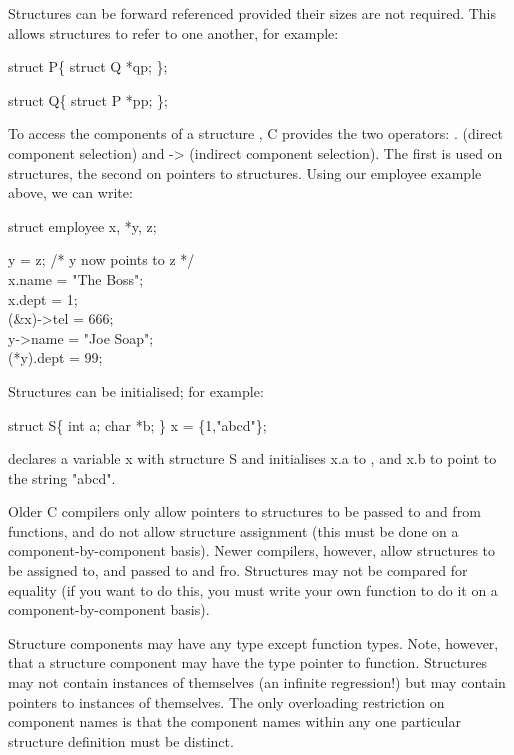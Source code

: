      Structures can  be  forward  referenced  
provided  their  sizes
are  not required. This allows structures to refer to one another,
for example:
\begin{code}
struct P\{ struct Q *qp; \}; \addVspace

struct Q\{ struct P *pp; \};
\end{code}
\noindent
     To access  the components  of a 
structure
, C provides the two
operators: {\cd .} ({\kc direct component  selection\/}) and {\cd ->}
({\kc indirect component selection\/}).  The first is used  on
structures, the second  on  pointers  to  structures.  Using  our
{\cd employee} example above, we can write:
\begin{code}
  struct employee x, *y, z;   \addVspace

  y = z; \tab\tab\tab /* y now points to z */ \\
  x.name = "The Boss";	   \\
  x.dept = 1;		   \\
  (\&x)->tel = 666;	   \\
  y->name = "Joe Soap";	   \\
  (*y).dept = 99;
\end{code}
\noindent
     Structures can be initialised; for example:
\begin{code}
struct S\{ int a; char *b; \} x = \{1,"abcd"\};
\end{code}
\noindent
 declares a variable {\cd x} with structure {\cd S} and initialises
{\cd x.a} to {}, and {\cd x.b} to point to the string {\cd
"abcd"}.

     Older C  compilers only  allow pointers to structures to be
passed to and from 
functions,  
and do not allow structure assignment
(this must be done on a com\-po\-nent-by-component basis).  Newer
compilers,  however, allow structures to be assigned to, and passed to
and fro.  Structures may  not be  compared for equality (if you want
to do this, you must write your own function to do it on a
com\-po\-nent-by-component basis).

     Structure components  may have  any type  except function types.
Note, however, that a structure component may have the type {\ms
pointer to function}.
Structures may not contain  instances of themselves (an infinite
regression!) but may contain pointers to  instances of  themselves.
The  only  overloading  restriction  on component names  is  that
the  component  names  within  any  one  particular structure
definition must be distinct.

